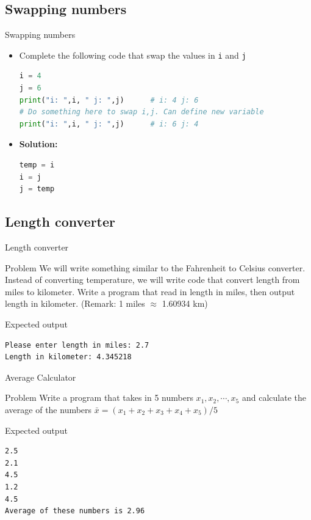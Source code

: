\documentclass[10pt,xcolor={table,dvipsnames},t]{beamer}
\begin{document}
\subsection{Swapping numbers}
\begin{frame}[fragile]{Swapping numbers}
  \begin{itemize}
    \item Complete the following code that swap the values in \texttt{i} and \texttt{j}
\begin{lstlisting}[language=python]
i = 4
j = 6
print("i: ",i, " j: ",j)      # i: 4 j: 6 
# Do something here to swap i,j. Can define new variable
print("i: ",i, " j: ",j)      # i: 6 j: 4
\end{lstlisting}
  \item \textbf{Solution:}
\begin{lstlisting}[language=python]
temp = i
i = j
j = temp
\end{lstlisting}
  \end{itemize}
\end{frame}

\subsection{Length converter}
\begin{frame}[fragile]{Length converter}
  \begin{exampleblock}{Problem}
    We will write something similar to the Fahrenheit to Celsius converter. Instead of converting temperature, we will write code that convert length from miles to kilometer. Write a program that read in length in miles, then output length in kilometer. (Remark: 1 miles $\approx$ 1.60934 km)
  \end{exampleblock}
  \begin{exampleblock}{Expected output}
\begin{lstlisting}
Please enter length in miles: 2.7
Length in kilometer: 4.345218
\end{lstlisting}
  \end{exampleblock}
\end{frame}

\begin{frame}[fragile]{Average Calculator}
  \begin{exampleblock}{Problem}
    Write a program that takes in 5 numbers $x_1,x_2,\cdots,x_5$ and calculate the average of the numbers $\bar{x} = (x_1 + x_2 + x_3 + x_4 + x_5)/5$
  \end{exampleblock}
  \begin{exampleblock}{Expected output}
\begin{lstlisting}
2.5
2.1
4.5
1.2
4.5
Average of these numbers is 2.96
\end{lstlisting}
      \end{exampleblock}
\end{frame}
\end{document}
